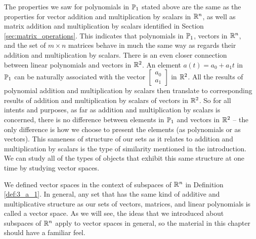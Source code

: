 The properties we saw for polynomials in $\mathbb{P}_1$ stated above are the same as the properties for vector addition and multiplication by scalars in $\mathbb{R}^n$, as well as matrix addition and multiplication by scalars identified in Section \ref{sec:matrix_operations}. This indicates that polynomials in $\mathbb{P}_1$, vectors in $\mathbb{R}^n$, and the set of $m \times n$ matrices behave in much the same way as regards their addition and multiplication by scalars. There is an even closer connection between linear polynomials and vectors in $\mathbb{R}^2$. An element $a(t) = a_0 + a_1t$ in $\mathbb{P}_1$ can be naturally associated with the vector $\left[ \begin{array}{c} a_0 \\ a_1 \end{array} \right]$ in $\mathbb{R}^2$. All the results of polynomial addition and multiplication by scalars then translate to corresponding results of addition and multiplication by scalars of vectors in $\mathbb{R}^2$. So for all intents and purposes, as far as addition and multiplication by scalars is concerned, there is no difference between elements in $\mathbb{P}_1$ and vectors in $\mathbb{R}^2$ -- the only difference is how we choose to present the elements (as polynomials or as vectors). This sameness of structure of our sets as it relates to addition and multiplication by scalars is the type of similarity mentioned in the introduction. We can study all of the types of objects that exhibit this same structure at one time by studying vector spaces.

\label{sec:vec_space}

We defined vector spaces in the context of subspaces of $\mathbb{R}^n$ in Definition \ref{def:3_a_1}. In general, any set that has the same kind of additive and multiplicative structure as our sets of vectors, matrices, and linear polynomials is called a vector space. As we will see, the ideas that we introduced about subspaces of $\mathbb{R}^n$ apply to vector spaces in general, so the material in this chapter should have a familiar feel. 



